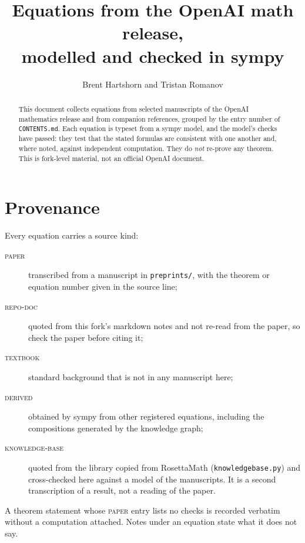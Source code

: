 \documentclass[10pt]{article}
\title{Equations from the OpenAI math release,\\ modelled and checked in sympy}
\author{Brent Hartshorn \orcidlink{0009-0004-2853-655X}
        and Tristan Romanov}
\date{}
\begin{document}
\maketitle

\begin{abstract}
\noindent
This document collects equations from selected manuscripts of the OpenAI mathematics release
and from companion references, grouped by the entry number of \texttt{CONTENTS.md}. Each equation
is typeset from a sympy model, and the model's checks have passed: they test that the stated
formulas are consistent with one another and, where noted, against independent computation.
They do \emph{not} re-prove any theorem. This is fork-level material, not an official OpenAI document.
\end{abstract}

\section*{Provenance}
Every equation carries a source kind:
\begin{description}
  \item[\textmd{\textsc{paper}}] transcribed from a manuscript in \texttt{preprints/}, with the theorem or
        equation number given in the source line;
  \item[\textmd{\textsc{repo-doc}}] quoted from this fork's markdown notes and not re-read from the paper, so
        check the paper before citing it;
  \item[\textmd{\textsc{textbook}}] standard background that is not in any manuscript here;
  \item[\textmd{\textsc{derived}}] obtained by sympy from other registered equations, including the
        compositions generated by the knowledge graph;
  \item[\textmd{\textsc{knowledge-base}}] quoted from the library copied from RosettaMath
        (\texttt{knowledgebase.py}) and cross-checked here against a model of the manuscripts. It is a second
        transcription of a result, not a reading of the paper.
\end{description}
A theorem statement whose \textsc{paper} entry lists no checks is recorded verbatim without a
computation attached. Notes under an equation state what it does not say.



\tableofcontents
\clearpage






\end{document}
